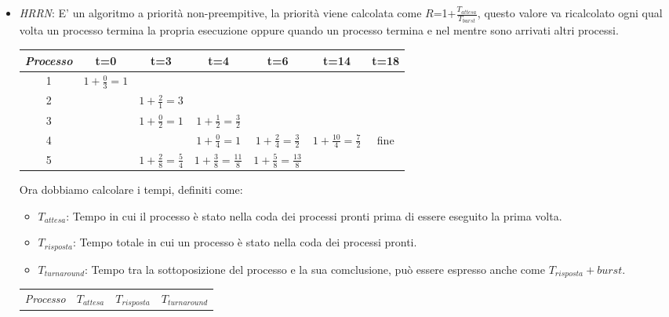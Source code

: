 \documentclass{article}
\begin{document}
    \begin{itemize}
        \item \emph{HRRN}: E' un algoritmo a priorità non-preempitive, la priorità viene calcolata come $R$=1+$\frac{T_{attesa}}{T_{burst}}$, questo valore va ricalcolato ogni qual volta un processo termina la propria esecuzione oppure quando un processo termina e nel mentre sono arrivati altri processi.\\
        \begin{center}
            \begin{tabular}{|c|c|c|c|c|c|c|}
                \hline
                \emph{Processo} & t=0 & t=3 & t=4 & t=6 & t=14 & t=18\\
                \hline
                1 & \cellcolor{blue!25}$1+\frac{0}{3}=1$ & & & & & \\
                \hline
                2 & & \cellcolor{blue!25}$1+\frac{2}{1}=3$ & & & &\\
                \hline
                3 & & $1+\frac{0}{2}=1$ & \cellcolor{blue!25}$1+\frac{1}{2}=\frac{3}{2}$ & & &\\
                \hline
                4 & & & $1+\frac{0}{4}=1$ & $1+\frac{2}{4}=\frac{3}{2}$ & \cellcolor{blue!25}$1+\frac{10}{4}=\frac{7}{2}$ & fine\\
                \hline
                5 & & $1+\frac{2}{8}=\frac{5}{4}$ & $1+\frac{3}{8}=\frac{11}{8}$ & \cellcolor{blue!25}$1+\frac{5}{8}=\frac{13}{8}$ & & \\
                \hline
            \end{tabular}
        \end{center}
        Ora dobbiamo calcolare i tempi, definiti come:
        \begin{itemize}
            \item $T_{attesa}$: Tempo in cui il processo è stato nella coda dei processi pronti prima di essere eseguito la prima volta.
            \item $T_{risposta}$: Tempo totale in cui un processo è stato nella coda dei processi pronti.
            \item $T_{turnaround}$: Tempo tra la sottoposizione del processo e la sua comclusione, può essere espresso anche come $T_{risposta}+burst$.
        \end{itemize}
        \begin{center}
            \begin{tabular}{|c|c|c|c|}
                \hline
                \emph{Processo} & $T_{attesa}$ & $T_{risposta}$ & $T_{turnaround}$\\

\end{tabular}
\end{center}
\end{itemize}
\end{document}
